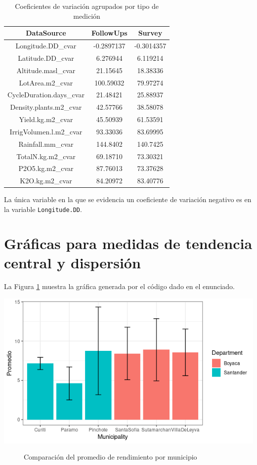 \documentclass[11pt,letterpaper]{article}
\begin{document}
	\begin{table}
		\centering
		\begin{tabular}{|c|c|c|} \hline
			DataSource & FollowUps & Survey\\ \hline
			Longitude.DD\_cvar & -0.2897137 & -0.3014357\\ 
			Latitude.DD\_cvar & 6.276944 & 6.119214\\ 
			Altitude.masl\_cvar & 21.15645 & 18.38336\\ 
			LotArea.m2\_cvar & 100.59032 &  79.97274\\ 
			CycleDuration.days\_cvar & 21.48421 & 25.88937\\ 
			Density.plants.m2\_cvar & 42.57766 & 38.58078\\ 
			Yield.kg.m2\_cvar & 45.50939 & 61.53591\\ 
			IrrigVolumen.l.m2\_cvar & 93.33036 & 83.69995\\ 
			Rainfall.mm\_cvar & 144.8402 & 140.7425\\ 
			TotalN.kg.m2\_cvar & 69.18710 & 73.30321\\ 
			P2O5.kg.m2\_cvar & 87.76013 & 73.37628\\ 
			K2O.kg.m2\_cvar & 84.20972 & 83.40776\\ 
			\hline
		\end{tabular}
		\caption{\label{tab:table-02} Coeficientes de variación agrupados por tipo de medición}
	\end{table}
	
	
	La única variable en la que se evidencia un coeficiente de variación negativo es en la variable {\tt Longitude.DD}. 

	\section{Gráficas para medidas de tendencia central y dispersión}
	La Figura \ref{fig:figure-01} muestra la gráfica generada por el código dado en el enunciado.
	
	\includegraphics[scale=0.8]{graph_01.png}
	\begin{figure}[h!]
		\caption{\label{fig:figure-01} Comparación del promedio de rendimiento por municipio}
	\end{figure}
\end{document}
